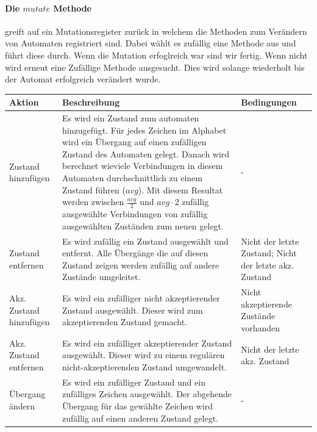 \paragraph{Die $mutate$ Methode} greift auf ein Mutationsregister zurück in welchem die Methoden zum Verändern von Automaten registriert sind. Dabei wählt es zufällig eine Methode aus und führt diese durch. Wenn die Mutation erfoglreich war sind wir fertig. Wenn nicht wird erneut eine Zufällige Methode ausgesucht. Dies wird solange wiederholt bis der Automat erfolgreich verändert wurde.

\begin{center}
  \begin{tabular}{| l | p{7cm} | p{4cm} |}
    \hline
    \textbf{Aktion} &  \textbf{Beschreibung} & \textbf{Bedingungen}\\
    \hline
    Zustand hinzufügen 
    & Es wird ein Zustand zum automaten hinzugefügt. Für jedes Zeichen im Alphabet wird ein Übergang auf einen zufälligen Zustand des Automaten gelegt. Danach wird berechnet wieviele Verbindungen in diesem Automaten durchschnittlich zu einem Zustand führen ($avg$). Mit diesem Resultat werden zwischen $\frac{avg}{2}$ und $avg \cdot 2$ zufällig ausgewählte Verbindungen von zufällig ausgewählten Zuständen zum neuen gelegt.
    & - \\
    \hline
    Zustand entfernen
    & Es wird zufällig ein Zustand ausgewählt und entfernt. Alle Übergänge die auf diesen Zustand zeigen werden zufällig auf andere Zustände umgeleitet.
    & Nicht der letzte Zustand; Nicht der letzte akz. Zustand \\
    \hline
    Akz. Zustand hinzufügen
    & Es wird ein zufälliger nicht akzeptierender Zustand ausgewählt. Dieser wird zum akzeptierenden Zustand gemacht.
    & Nicht akzeptierende Zustände vorhanden \\
    \hline
    Akz. Zustand entfernen
    & Es wird ein zufälliger akzeptierender Zustand ausgewählt. Dieser wird zu einem regulären nicht-akzeptierenden Zustand umgewandelt.
    & Nicht der letzte akz. Zustand \\
    \hline
    Übergang ändern
    & Es wird ein zufälliger Zustand und ein zufälliges Zeichen ausgewählt. Der abgehende Übergang für das gewählte Zeichen wird zufällig auf einen anderen Zustand gelegt.
    & - \\
    \hline 
  \end{tabular}
\end{center}